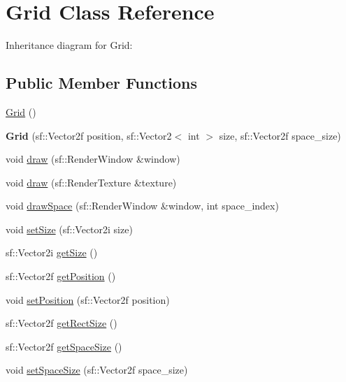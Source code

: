 \hypertarget{classGrid}{}\section{Grid Class Reference}
\label{classGrid}


Inheritance diagram for Grid\+:
\subsection*{Public Member Functions}
\begin{DoxyCompactItemize}
\item 
\hyperlink{classGrid_a4ac9ff4f63552b4c61ff90fcb35ad66c}{Grid} ()
\item 
\mbox{\label{classGrid_aa8ed2851d1e58051f5add9d177fbdcd6}} 
{\bfseries Grid} (sf\+::\+Vector2f position, sf\+::\+Vector2$<$ int $>$ size, sf\+::\+Vector2f space\+\_\+size)
\item 
void \hyperlink{classGrid_a9b42b1d0dcfc434d790b11faf4b461ce}{draw} (sf\+::\+Render\+Window \&window)
\item 
void \hyperlink{classGrid_aba72dde0bcafe22ad1ac4ef11437d758}{draw} (sf\+::\+Render\+Texture \&texture)
\item 
void \hyperlink{classGrid_a4b521f4c9a986643de4bc78ca734f121}{draw\+Space} (sf\+::\+Render\+Window \&window, int space\+\_\+index)
\item 
void \hyperlink{classGrid_ad709414fa82c4a0d429244333625c5d4}{set\+Size} (sf\+::\+Vector2i size)
\item 
sf\+::\+Vector2i \hyperlink{classGrid_aee705a327a063ddd21d70075fcfa28a5}{get\+Size} ()
\item 
sf\+::\+Vector2f \hyperlink{classGrid_a47e4cb0f73060c1b6d23f6d31182b6c1}{get\+Position} ()
\item 
void \hyperlink{classGrid_a346fbade99f7202d870980a32f7e3290}{set\+Position} (sf\+::\+Vector2f position)
\item 
sf\+::\+Vector2f \hyperlink{classGrid_ac1bef10cb20d82aac5caebdd08fc5900}{get\+Rect\+Size} ()
\item 
sf\+::\+Vector2f \hyperlink{classGrid_aab378faa1bf9567a00d871a26ecf818a}{get\+Space\+Size} ()
\item 
void \hyperlink{classGrid_ae53bf0b9448b14028ae225cb5f00c00c}{set\+Space\+Size} (sf\+::\+Vector2f space\+\_\+size)
\end{DoxyCompactItemize}
